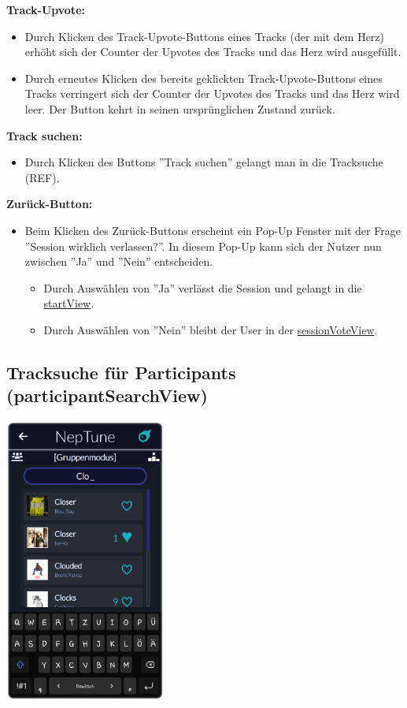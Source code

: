 \documentclass[oneside, ngerman]{sdqtechreport}
\begin{document}
\textbf{Track-Upvote:}
\begin{itemize}
    \item Durch Klicken des Track-Upvote-Buttons eines Tracks (der mit dem Herz) erhöht sich der Counter der Upvotes des Tracks und das Herz wird ausgefüllt.
    \item Durch erneutes Klicken des bereits geklickten Track-Upvote-Buttons eines Tracks verringert sich der Counter der Upvotes des Tracks und das Herz wird leer. Der Button kehrt in seinen ursprünglichen Zustand zurück.
\end{itemize}

\textbf{Track suchen:}
\begin{itemize}
    \item Durch Klicken des Buttons ''Track suchen'' gelangt man in die Tracksuche (REF).
\end{itemize}

\textbf{Zurück-Button:}
\begin{itemize}
    \item Beim Klicken des Zurück-Buttons erscheint ein Pop-Up Fenster mit der Frage ''Session wirklich verlassen?''. In diesem Pop-Up kann sich der Nutzer nun zwischen ''Ja'' und ''Nein'' entscheiden.
    \begin{itemize}
        \item Durch Auswählen von ''Ja'' verlässt die Session und gelangt in die \hyperlink{startView}{startView}.
        \item Durch Auswählen von ''Nein'' bleibt der User in der \hyperlink{sessionVoteView}{sessionVoteView}.
    \end{itemize}
\end{itemize}

\subsection{Tracksuche für Participants (participantSearchView)}
\label{sec:Benutzeroberfläche:participantSearchView}


\begin{center}
    \hypertarget{participantSearchView}{}
    \includegraphics[width=0.4\textwidth]{LATEX/Pflichtenheft/GraphicDesigns/userSearchPage.png}
\end{center}
\end{document}

